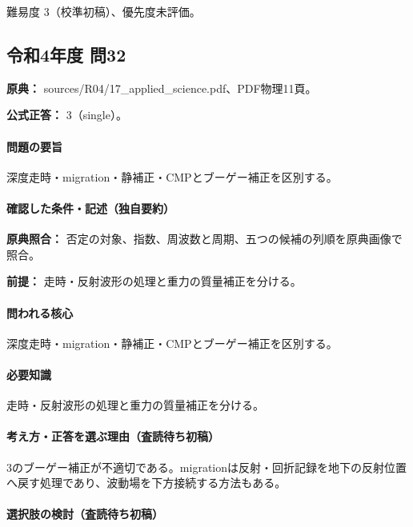 \par 難易度 3（校準初稿）、優先度未評価。

\subsection{令和4年度 問32}
\label{q:r04-reg-applied-32}

\noindent\textbf{原典：} sources/R04/17\_applied\_science.pdf、PDF物理11頁。

\textbf{公式正答：} 3（single）。

\paragraph{問題の要旨} 深度走時・migration・静補正・CMPとブーゲー補正を区別する。

\paragraph{確認した条件・記述（独自要約）}\mbox{}\par

\noindent\textbf{原典照合：} 否定の対象、指数、周波数と周期、五つの候補の列順を原典画像で照合。\par

\noindent\textbf{前提：} 走時・反射波形の処理と重力の質量補正を分ける。\par

\paragraph{問われる核心} 深度走時・migration・静補正・CMPとブーゲー補正を区別する。

\paragraph{必要知識} 走時・反射波形の処理と重力の質量補正を分ける。

\paragraph{考え方・正答を選ぶ理由（査読待ち初稿）} 3のブーゲー補正が不適切である。migrationは反射・回折記録を地下の反射位置へ戻す処理であり、波動場を下方接続する方法もある。

\paragraph{選択肢の検討（査読待ち初稿）}\mbox{}\par


